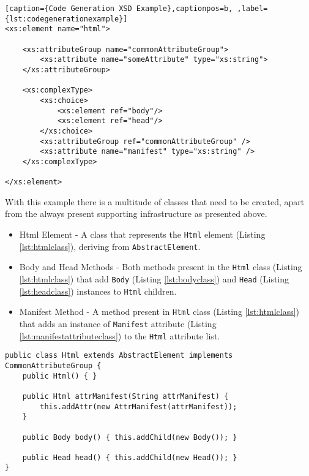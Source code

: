\begin{minipage}{\linewidth}
\begin{lstlisting}[caption={Code Generation XSD Example},captionpos=b, ,label={lst:codegenerationexample}]
<xs:element name="html">
    
    <xs:attributeGroup name="commonAttributeGroup">
        <xs:attribute name="someAttribute" type="xs:string">
    </xs:attributeGroup>

    <xs:complexType>
        <xs:choice>
            <xs:element ref="body"/>
            <xs:element ref="head"/>
        </xs:choice>
        <xs:attributeGroup ref="commonAttributeGroup" />
        <xs:attribute name="manifest" type="xs:string" />
    </xs:complexType>
    
</xs:element>
\end{lstlisting}
\end{minipage}

\noindent
With this example there is a multitude of classes that need to be created, apart from the always present supporting infrastructure as presented above. 

\begin{itemize}
	\item Html Element - A class that represents the \texttt{Html} element (Listing \ref{lst:htmlclass}), deriving from \texttt{AbstractElement}.
	\item Body and Head Methods - Both methods present in the \texttt{Html} class (Listing \ref{lst:htmlclass}) that add \texttt{Body} (Listing \ref{lst:bodyclass}) and \texttt{Head} (Listing \ref{lst:headclass}) instances to \texttt{Html} children.
	\item Manifest Method - A method present in \texttt{Html} class (Listing \ref{lst:htmlclass}) that adds an instance of \texttt{Manifest} attribute (Listing \ref{lst:manifestattributeclass}) to the \texttt{Html} attribute list.
\end{itemize}

\newpage


\begin{lstlisting}[caption={Html Element Class},captionpos=b,label={lst:htmlclass}]
public class Html extends AbstractElement implements CommonAttributeGroup {
    public Html() { }
    
    public Html attrManifest(String attrManifest) {
        this.addAttr(new AttrManifest(attrManifest));
    }
    
    public Body body() { this.addChild(new Body()); }
        
    public Head head() { this.addChild(new Head()); }
}
\end{lstlisting}

